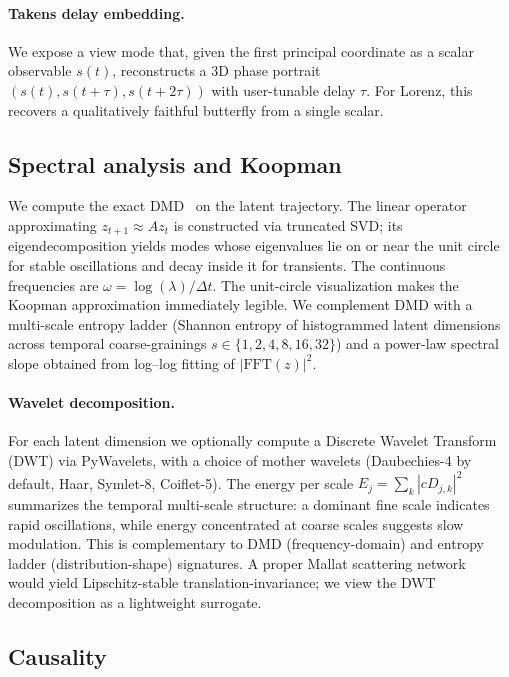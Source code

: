 \documentclass[11pt,a4paper]{article}
\begin{document}
\paragraph{Takens delay embedding.} We expose a view mode that, given
the first principal coordinate as a scalar observable $s(t)$,
reconstructs a 3D phase portrait $(s(t), s(t+\tau), s(t+2\tau))$
with user-tunable delay $\tau$. For Lorenz, this recovers a
qualitatively faithful butterfly from a single scalar.

\subsection{Spectral analysis and Koopman}

We compute the exact DMD~\cite{tu2014dmd} on the latent trajectory.
The linear operator approximating $z_{t+1} \approx A z_t$ is
constructed via truncated SVD; its eigendecomposition yields modes
whose eigenvalues lie on or near the unit circle for stable
oscillations and decay inside it for transients. The continuous
frequencies are $\omega = \log(\lambda)/\Delta t$. The unit-circle
visualization makes the Koopman approximation immediately legible.
We complement DMD with a multi-scale entropy ladder (Shannon entropy
of histogrammed latent dimensions across temporal coarse-grainings
$s \in \{1,2,4,8,16,32\}$) and a power-law spectral slope obtained
from log--log fitting of $|\text{FFT}(z)|^2$.

\paragraph{Wavelet decomposition.} For each latent dimension we
optionally compute a Discrete Wavelet Transform (DWT) via
PyWavelets, with a choice of mother wavelets (Daubechies-4 by
default, Haar, Symlet-8, Coiflet-5). The energy per scale
$E_j = \sum_k |cD_{j,k}|^2$ summarizes the temporal multi-scale
structure: a dominant fine scale indicates rapid oscillations,
while energy concentrated at coarse scales suggests slow modulation.
This is complementary to DMD (frequency-domain) and entropy ladder
(distribution-shape) signatures. A proper Mallat scattering
network~\cite{mallat2012scattering} would yield Lipschitz-stable
translation-invariance; we view the DWT decomposition as a
lightweight surrogate.

\subsection{Causality}
\end{document}
